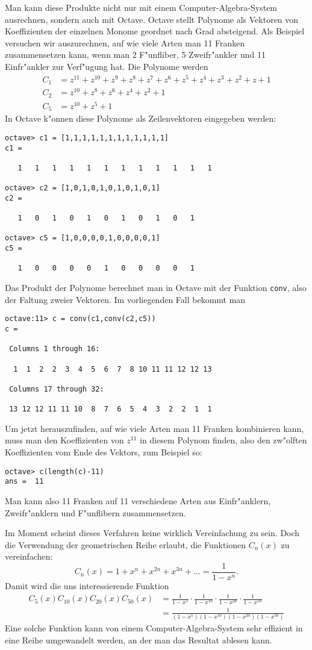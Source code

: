 Man kann diese Produkte nicht nur mit einem Computer-Algebra-System
ausrechnen, sondern auch mit Octave.
Octave stellt Polynome als
Vektoren von Koeffizienten der einzelnen Monome geordnet nach Grad
absteigend.
Als Beispiel versuchen wir auszurechnen, auf wie viele
Arten man 11 Franken zusammensetzen kann, wenn man 2 F"unfliber,
5 Zweifr"ankler und 11 Einfr"ankler zur Verf"ugung hat.
Die Polynome werden
\begin{align*}
C_1&=z^{11}+z^{10}+z^9+z^8+z^7+z^6+z^5+z^4+z^3+z^2+z+1\\
C_2&=z^{10}+z^8+z^6+z^4+z^2+1\\
C_5&=z^{10}+z^5+1
\end{align*}
In Octave k"onnen diese Polynome als Zeilenvektoren eingegeben werden:
\begin{verbatim}
octave> c1 = [1,1,1,1,1,1,1,1,1,1,1,1]
c1 =

   1   1   1   1   1   1   1   1   1   1   1   1

octave> c2 = [1,0,1,0,1,0,1,0,1,0,1]
c2 =

   1   0   1   0   1   0   1   0   1   0   1

octave> c5 = [1,0,0,0,0,1,0,0,0,0,1]
c5 =

   1   0   0   0   0   1   0   0   0   0   1
\end{verbatim}
Das Produkt der Polynome berechnet man in Octave mit der Funktion
{\tt conv}, also der Faltung zweier Vektoren.
Im vorliegenden Fall bekommt man
\begin{verbatim}
octave:11> c = conv(c1,conv(c2,c5))
c =

 Columns 1 through 16:

  1  1  2  2  3  4  5  6  7  8 10 11 11 12 12 13

 Columns 17 through 32:

 13 12 12 11 11 10  8  7  6  5  4  3  2  2  1  1
\end{verbatim}
Um jetzt herauszufinden, auf wie viele Arten man 11 Franken
kombinieren kann, muss man den Koeffizienten von $z^{11}$ in diesem
Polynom finden, also den zw"olften Koeffizienten vom Ende des
Vektors, zum Beispiel so:
\begin{verbatim}
octave> c(length(c)-11)
ans =  11
\end{verbatim}
Man kann also 11 Franken auf 11 verschiedene Arten aus Einfr"anklern,
Zweifr"anklern und F"unflibern zusammensetzen.

Im Moment scheint dieses Verfahren keine wirklich Vereinfachung
zu sein.
Doch die Verwendung der geometrischen Reihe erlaubt, die
Funktionen $C_n(x)$ zu vereinfachen:
\[
C_n(x)=1+x^n+x^{2n}+x^{3n}+\dots = \frac1{1-x^n}.
\]
Damit wird die uns interessierende Funktion
\begin{align*}
C_5(x) C_{10}(x) C_{20}(x) C_{50}(x)
&=
\frac1{1-x^5}\cdot
\frac1{1-x^{10}}\cdot
\frac1{1-x^{20}}\cdot
\frac1{1-x^{50}}
\\
&=
\frac1{
(1-x^5)
(1-x^{10})
(1-x^{20})
(1-x^{50})
}
\end{align*}
Eine solche Funktion kann von einem Computer-Algebra-System sehr effizient
in eine Reihe umgewandelt werden, an der man das Resultat ablesen kann.

